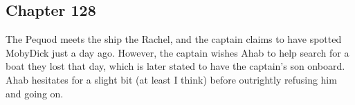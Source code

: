 \subsection{Chapter 128}

The Pequod meets the ship the Rachel, and the captain claims to have spotted
MobyDick just a day ago. However, the captain wishes Ahab to help search for a
boat they lost that day, which is later stated to have the captain's son
onboard. Ahab hesitates for a slight bit (at least I think) before outrightly
refusing him and going on.
